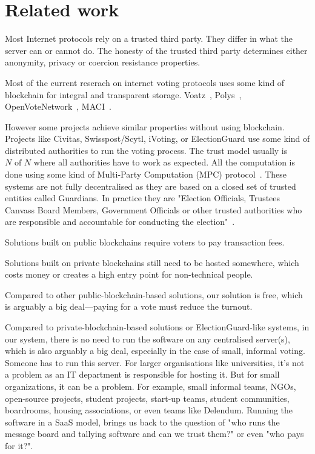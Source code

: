 \documentclass{article}
\begin{document}
\section{Related work}
Most Internet protocols rely on a trusted third party. They differ in what the server can or cannot do. The honesty of the trusted third party determines either anonymity, privacy or coercion resistance properties.

Most of the current reserach on internet voting protocols uses some kind of blockchain for integral and transparent storage. 
Voatz~\cite{mooreWestVirginiaMobile2019}, 
Polys~\cite{PolysOnlineVoting}, 
OpenVoteNetwork~\cite{haoAnonymousVotingTworound2010}, MACI~\cite{ethereumfoundationMinimalAntiCollusionInfrastructure2022}.

However some projects achieve similar properties without using blockchain. Projects like Civitas, Swisspost/Scytl, iVoting, or ElectionGuard use some kind of distributed authorities to run the voting process. The trust model usually is $N \textrm{ of } N$ where all authorities have to work as expected. All the computation is done using some kind of Multi-Party Computation (MPC) protocol~\cite{boweMultipartyProtocolConstructing2018}.
These systems are not fully decentralised as they are based on a closed set of trusted entities called Guardians. In practice they are "Election Officials, Trustees Canvass Board Members, Government Officials or other trusted authorities who are responsible and accountable for conducting the election"~\cite{ElectionGuardWhoGuardian}.


Solutions built on public blockchains require voters to pay transaction fees.

Solutions built on private blockchains still need to be hosted somewhere, which costs money or creates a high entry point for non-technical people.

Compared to other public-blockchain-based solutions, our solution is free, which is arguably a big deal—paying for a vote must reduce the turnout.

Compared to private-blockchain-based solutions or ElectionGuard-like systems, in our system, there is no need to run the software on any centralised server(s), which is also arguably a big deal, especially in the case of small, informal voting. Someone has to run this server. For larger organisations like universities, it's not a problem as an IT department is responsible for hosting it. But for small organizations, it can be a problem. For example, small informal teams, NGOs, open-source projects, student projects, start-up teams, student communities, boardrooms, housing associations, or even teams like Delendum. Running the software in a SaaS model, brings us back to the question of "who runs the message board and tallying software and can we trust them?" or even "who pays for it?".
\end{document}
